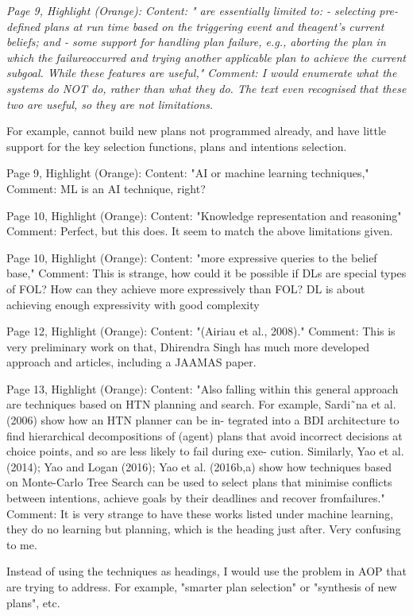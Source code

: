 \documentclass[12pt]{article}
\newenvironment{reviews}{\bigskip\itshape}{\upshape\bigskip}
\begin{document}
\begin{reviews}
Page 9, Highlight (Orange):
Content: " are essentially limited to: - selecting pre-defined plans at run time based on the triggering event and theagent's current beliefs; and - some support for handling plan failure, e.g., aborting the plan in which the failureoccurred and trying another applicable plan to achieve the current subgoal. While these features are useful,"
Comment: I would enumerate what the systems do NOT do, rather than what they do. The text even recognised that these two are useful, so they are not limitations. 

For example, cannot build new plans not programmed already, and have little support for the key selection functions, plans and intentions selection.

Page 9, Highlight (Orange):
Content: "AI or machine learning techniques,"
Comment: ML is an AI technique, right?

Page 10, Highlight (Orange):
Content: "Knowledge representation and reasoning"
Comment: Perfect, but this does. It seem to match the above limitations given.

Page 10, Highlight (Orange):
Content: "more expressive queries to the belief base,"
Comment: This is strange, how could it be possible if DLs are special types of FOL? How can they achieve more expressively than FOL? DL is about achieving enough expressivity with good complexity 

Page 12, Highlight (Orange):
Content: "(Airiau et al., 2008)."
Comment: This is very preliminary work on that, Dhirendra Singh has much more developed approach and articles, including a JAAMAS paper.

Page 13, Highlight (Orange):
Content: "Also falling within this general approach are techniques based on HTN planning and search. For example, Sardi˜na et al. (2006) show how an HTN planner can be in- tegrated into a BDI architecture to find hierarchical decompositions of (agent) plans that avoid incorrect decisions at choice points, and so are less likely to fail during exe- cution. Similarly, Yao et al. (2014); Yao and Logan (2016); Yao et al. (2016b,a) show how techniques based on Monte-Carlo Tree Search can be used to select plans that minimise conflicts between intentions, achieve goals by their deadlines and recover fromfailures."
Comment: It is very strange to have these works listed under machine learning, they do no learning but planning, which is the heading just after. Very confusing to me. 

Instead of using the techniques as headings, I would use the problem in AOP that are trying to address. For example, "smarter plan selection" or "synthesis of new plans", etc.


\end{reviews}
\end{document}
